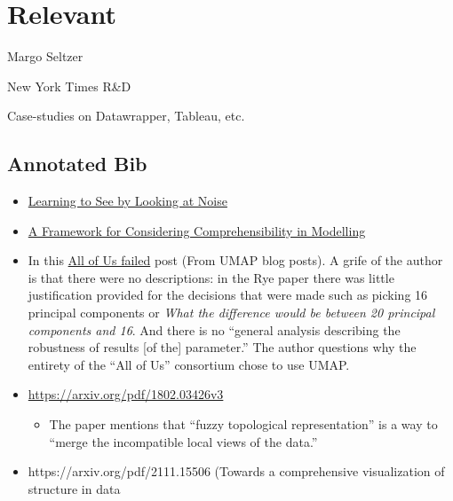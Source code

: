 \documentclass[
]{article}
\providecommand{\tightlist}{%
  \setlength{\itemsep}{0pt}\setlength{\parskip}{0pt}}\usepackage{longtable,booktabs,array}
\begin{document}
\section{Relevant}\label{relevant}

Margo Seltzer

New York Times R\&D

Case-studies on Datawrapper, Tableau, etc.

\subsection{Annotated Bib}\label{annotated-bib}

\begin{itemize}
\item
  \href{https://mbaradad.github.io/learning_with_noise/}{Learning to See
  by Looking at Noise}
\item
  \href{https://graphics.cs.wisc.edu/Papers/2016/Gle16/compjournal.pdf}{A
  Framework for Considering Comprehensibility in Modelling}
\item
  In this
  \href{https://liorpachter.wordpress.com/2024/02/26/all-of-us-failed/}{All
  of Us failed} post (From UMAP blog posts). A grife of the author is
  that there were no descriptions: in the Rye paper there was little
  justification provided for the decisions that were made such as
  picking 16 principal components or \emph{What the difference would be
  between 20 principal components and 16}. And there is no ``general
  analysis describing the robustness of results {[}of the{]}
  parameter.'' The author questions why the entirety of the ``All of
  Us'' consortium chose to use UMAP.
\item
  \href{UMAP\%20paper}{https://arxiv.org/pdf/1802.03426v3}

  \begin{itemize}
  \tightlist
  \item
    The paper mentions that ``fuzzy topological representation'' is a
    way to ``merge the incompatible local views of the data.''
  \end{itemize}
\item
  https://arxiv.org/pdf/2111.15506 (Towards a comprehensive
  visualization of structure in data


\end{itemize}
\end{document}
